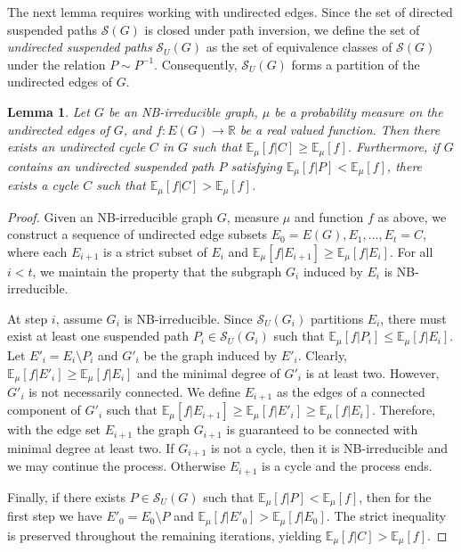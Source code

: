 \documentclass{article}
\newtheorem{lemma}[theorem]{Lemma}
\newcommand{\R}{\mathbb{R}}  %
\newcommand{\E}{\mathbb{E}} %
\begin{document}
The next lemma requires working with undirected edges. Since the set of directed suspended paths $\mathcal{S}(G)$ is closed under path inversion, we define the set of {\em undirected suspended paths} $\mathcal{S}_U(G)$ as the set of equivalence classes of $\mathcal{S}(G)$ under the relation $P \sim P^{-1}$. Consequently, $\mathcal{S}_U(G)$ forms a partition of the undirected edges of $G$.

\begin{lemma}\label{lemma:find_an_improving_cycle}
    Let $G$ be an NB-irreducible graph, $\mu$ be a probability measure on the undirected edges of $G$, and $f:E(G)\to\R$ be a real valued function.
    Then there exists an undirected cycle $C$ in $G$ such that $\E_\mu[f|C] \geq \E_\mu[f]$.
    Furthermore, if $G$ contains an undirected suspended path $P$ satisfying $\E_\mu[f|P] < \E_\mu[f]$,
    there exists a cycle $C$ such that $\E_\mu[f|C] > \E_\mu[f]$.
\end{lemma}

\begin{proof}
    Given an NB-irreducible graph $G$, measure $\mu$ and function $f$ as above, we construct a sequence of undirected edge subsets $E_0=E(G), E_1, \ldots, E_t=C$, 
    where each $E_{i+1}$ is a strict subset of $E_i$ and $\E_\mu[f|E_{i+1}]  \geq \E_\mu[f|E_i]$.
    For all $i < t$, we maintain the property that the subgraph $G_i$ induced by $E_i$ is NB-irreducible.
    
    At step $i$, assume $G_i$ is NB-irreducible. 
    Since $\mathcal{S}_U(G_i)$ partitions $E_i$, there must exist at least one suspended path $P_i \in \mathcal{S}_U(G_i)$ such that $\E_\mu[f|P_i] \leq \E_\mu[f|E_i]$. 
    Let $E'_i = E_i \setminus P_i$ and $G'_i$ be the graph induced by $E'_i$.
    Clearly, $\E_\mu[f|E'_i] \geq \E_\mu[f|E_i]$ and the minimal degree of $G'_i$ is at least two.
    However, $G'_i$ is not necessarily connected. 
    We define $E_{i+1}$ as the edges of a connected component of $G'_i$ such that $\E_\mu[f|E_{i+1}] \geq \E_\mu[f|E'_i] \geq \E_\mu[f|E_i]$.
    Therefore, with the edge set $E_{i+1}$ the graph $G_{i+1}$ is guaranteed to be connected with minimal degree at least two.
    If $G_{i+1}$ is not a cycle, then it is NB-irreducible and we may continue the process.
    Otherwise $E_{i+1}$ is a cycle and the process ends.

    Finally, if there exists $P \in \mathcal{S}_U(G)$ such that $\E_\mu[f|P] < \E_\mu[f]$, then for the first step we have $E'_0 = E_0 \setminus P$ and $\E_\mu[f|E'_0] > \E_\mu[f|E_0]$. 
    The strict inequality is preserved throughout the remaining iterations, yielding $\E_\mu[f|C] > \E_\mu[f]$.
\end{proof}
\end{document}
